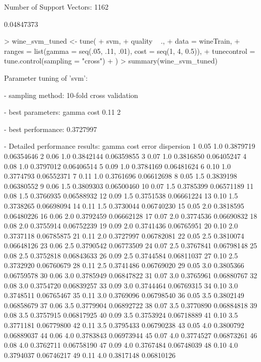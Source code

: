 \documentclass{article}
\begin{document}
\begin{Schunk}
\begin{Soutput}
Number of Support Vectors:  1162
\end{Soutput}
\begin{Soutput}
[1] 0.04847373
\end{Soutput}
\begin{Sinput}
> wine_svm_tuned <- tune(
+   svm,
+   quality ~ .,
+   data = wineTrain,
+   ranges = list(gamma = seq(.05, .11, .01), cost = seq(1, 4, 0.5)),
+   tunecontrol = tune.control(sampling = "cross")
+ )
> summary(wine_svm_tuned)
\end{Sinput}
\begin{Soutput}
Parameter tuning of 'svm':

- sampling method: 10-fold cross validation 

- best parameters:
 gamma cost
  0.11    2

- best performance: 0.3727997 

- Detailed performance results:
   gamma cost     error dispersion
1   0.05  1.0 0.3879719 0.06354646
2   0.06  1.0 0.3842144 0.06359855
3   0.07  1.0 0.3816850 0.06405247
4   0.08  1.0 0.3797012 0.06406514
5   0.09  1.0 0.3784169 0.06481624
6   0.10  1.0 0.3774793 0.06552371
7   0.11  1.0 0.3761696 0.06612698
8   0.05  1.5 0.3839198 0.06380552
9   0.06  1.5 0.3809303 0.06500460
10  0.07  1.5 0.3785399 0.06571189
11  0.08  1.5 0.3766935 0.06588932
12  0.09  1.5 0.3751538 0.06661224
13  0.10  1.5 0.3738265 0.06698094
14  0.11  1.5 0.3730044 0.06740230
15  0.05  2.0 0.3818595 0.06480226
16  0.06  2.0 0.3792459 0.06662128
17  0.07  2.0 0.3774536 0.06690832
18  0.08  2.0 0.3755914 0.06752239
19  0.09  2.0 0.3741436 0.06765951
20  0.10  2.0 0.3737118 0.06785875
21  0.11  2.0 0.3727997 0.06782081
22  0.05  2.5 0.3810074 0.06648126
23  0.06  2.5 0.3790542 0.06773509
24  0.07  2.5 0.3767841 0.06798148
25  0.08  2.5 0.3752818 0.06843633
26  0.09  2.5 0.3744584 0.06811037
27  0.10  2.5 0.3732920 0.06760679
28  0.11  2.5 0.3741486 0.06769020
29  0.05  3.0 0.3805366 0.06759578
30  0.06  3.0 0.3785949 0.06847822
31  0.07  3.0 0.3765961 0.06880767
32  0.08  3.0 0.3754720 0.06839257
33  0.09  3.0 0.3744464 0.06769315
34  0.10  3.0 0.3748511 0.06765467
35  0.11  3.0 0.3769096 0.06798540
36  0.05  3.5 0.3802149 0.06858679
37  0.06  3.5 0.3779904 0.06892722
38  0.07  3.5 0.3770890 0.06884818
39  0.08  3.5 0.3757915 0.06817925
40  0.09  3.5 0.3753924 0.06718889
41  0.10  3.5 0.3771181 0.06779800
42  0.11  3.5 0.3795433 0.06790238
43  0.05  4.0 0.3800792 0.06889037
44  0.06  4.0 0.3783843 0.06973944
45  0.07  4.0 0.3774527 0.06873261
46  0.08  4.0 0.3762711 0.06758190
47  0.09  4.0 0.3767484 0.06748039
48  0.10  4.0 0.3794037 0.06746217
49  0.11  4.0 0.3817148 0.06810126
\end{Soutput}
\end{Schunk}
\end{document}
